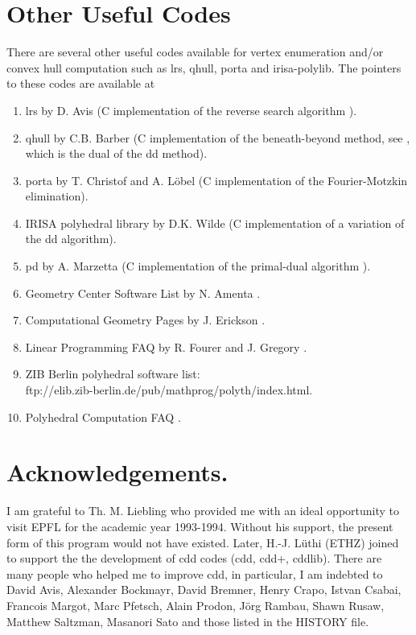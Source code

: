 \documentclass[11pt]{article}
\newcommand {\0} {{\bf 0}}
\begin{document}
\section{Other Useful Codes}  \label{CODES}
There are several other useful codes available for vertex enumeration and/or
convex hull computation  such as lrs, qhull, porta and irisa-polylib.
The pointers to these codes are available at
\begin{enumerate}
\item lrs by D. Avis \cite{a-uglrs-97} (C implementation of the reverse search algorithm 
\cite{af-pachv-92}). 

\item qhull by C.B. Barber \cite{bdh-qach-95} (C implementation of
the beneath-beyond method, see \cite{e-acg-87,m-cg-94},
which is the dual of the dd method). 

\item porta by T. Christof and A. L{\"o}bel \cite{cl-porta-97} (C implementation
of the Fourier-Motzkin elimination).

\item IRISA polyhedral library by D.K. Wilde
\cite{w-ldpo-93b} (C implementation
of a variation of the dd algorithm).

\item pd by A. Marzetta \cite{m-pdcip-97} (C implementation of the primal-dual algorithm 
\cite{bfm-pdmvf-97}). 

 \item Geometry Center Software List by N. Amenta \cite{a-dcg}.

 \item Computational Geometry Pages by J. Erickson \cite{e-cgp}.

 \item Linear Programming FAQ by R. Fourer and J. Gregory \cite{fg-lpfaq}.

 \item ZIB Berlin polyhedral software list:\\
{ftp://elib.zib-berlin.de/pub/mathprog/polyth/index.html}.

\item Polyhedral Computation FAQ \cite{f-pcfaq-98}.
\end{enumerate}


\section*{Acknowledgements.} 
I am  grateful to Th. M. Liebling who
provided me with an ideal opportunity to visit EPFL
for the academic year 1993-1994.  Without his 
support, the present form of this program would not have existed.
Later, H.-J. L\"uthi (ETHZ) joined to support the 
the development of cdd codes (cdd, cdd+, cddlib).
There are many people who helped me to improve cdd, in particular,
I am indebted to David Avis, 
Alexander Bockmayr, David Bremner, Henry Crapo, Istvan Csabai, 
Francois Margot, Marc Pfetsch, Alain Prodon, J\"org Rambau,
Shawn Rusaw, Matthew Saltzman, Masanori Sato and those listed
in the HISTORY file.




\end{document}
